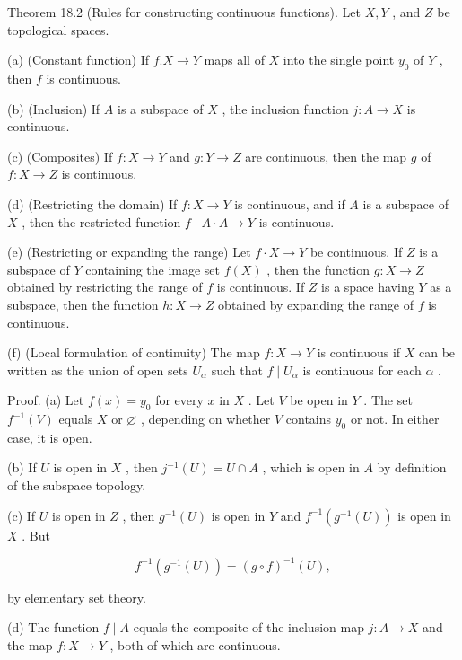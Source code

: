 \documentclass[10pt]{article}
\begin{document}
Theorem 18.2 (Rules for constructing continuous functions). Let \(X,Y\) , and \(Z\) be topological spaces.

(a) (Constant function) If \(f.X \rightarrow  Y\) maps all of \(X\) into the single point \({y}_{0}\) of \(Y\) , then \(f\) is continuous.

(b) (Inclusion) If \(A\) is a subspace of \(X\) , the inclusion function \(j : A \rightarrow  X\) is continuous.

(c) (Composites) If \(f : X \rightarrow  Y\) and \(g : Y \rightarrow  Z\) are continuous, then the map \(g\) of \(f : X \rightarrow  Z\) is continuous.

(d) (Restricting the domain) If \(f : X \rightarrow  Y\) is continuous, and if \(A\) is a subspace of \(X\) , then the restricted function \(f \mid  A \cdot  A \rightarrow  Y\) is continuous.

(e) (Restricting or expanding the range) Let \(f \cdot  X \rightarrow  Y\) be continuous. If \(Z\) is a subspace of \(Y\) containing the image set \(f\left( X\right)\) , then the function \(g : X \rightarrow  Z\) obtained by restricting the range of \(f\) is continuous. If \(Z\) is a space having \(Y\) as a subspace, then the function \(h : X \rightarrow  Z\) obtained by expanding the range of \(f\) is continuous.

(f) (Local formulation of continuity) The map \(f : X \rightarrow  Y\) is continuous if \(X\) can be written as the union of open sets \({U}_{\alpha }\) such that \(f \mid  {U}_{\alpha }\) is continuous for each \(\alpha\) .

Proof. (a) Let \(f\left( x\right)  = {y}_{0}\) for every \(x\) in \(X\) . Let \(V\) be open in \(Y\) . The set \({f}^{-1}\left( V\right)\) equals \(X\) or \(\varnothing\) , depending on whether \(V\) contains \({y}_{0}\) or not. In either case, it is open.

(b) If \(U\) is open in \(X\) , then \({j}^{-1}\left( U\right)  = U \cap  A\) , which is open in \(A\) by definition of the subspace topology.

(c) If \(U\) is open in \(Z\) , then \({g}^{-1}\left( U\right)\) is open in \(Y\) and \({f}^{-1}\left( {{g}^{-1}\left( U\right) }\right)\) is open in \(X\) . But

\[
{f}^{-1}\left( {{g}^{-1}\left( U\right) }\right)  = {\left( g \circ  f\right) }^{-1}\left( U\right) ,
\]

by elementary set theory.

(d) The function \(f \mid  A\) equals the composite of the inclusion map \(j : A \rightarrow  X\) and the map \(f : X \rightarrow  Y\) , both of which are continuous.
\end{document}
